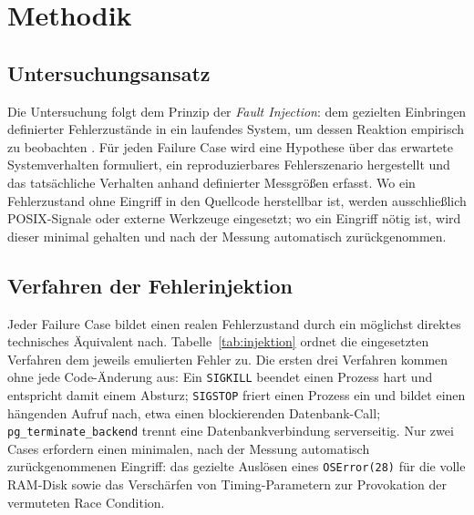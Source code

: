 
\section{Methodik}
\label{sec:methodik}

\subsection{Untersuchungsansatz}
\label{sec:methodik-ansatz}

Die Untersuchung folgt dem Prinzip der \textit{Fault Injection}: dem gezielten Einbringen
definierter Fehlerzustände in ein laufendes System, um dessen Reaktion empirisch zu
beobachten \cite{hsueh1997}. Für jeden Failure Case wird eine Hypothese über das erwartete
Systemverhalten formuliert, ein reproduzierbares Fehlerszenario hergestellt und das
tatsächliche Verhalten anhand definierter Messgrößen erfasst. Wo ein Fehlerzustand ohne
Eingriff in den Quellcode herstellbar ist, werden ausschließlich POSIX-Signale oder
externe Werkzeuge eingesetzt; wo ein Eingriff nötig ist, wird dieser minimal gehalten und
nach der Messung automatisch zurückgenommen.

\subsection{Verfahren der Fehlerinjektion}
\label{sec:methodik-injektion}

Jeder Failure Case bildet einen realen Fehlerzustand durch ein möglichst direktes
technisches Äquivalent nach. Tabelle~\ref{tab:injektion} ordnet die eingesetzten Verfahren
dem jeweils emulierten Fehler zu. Die ersten drei Verfahren kommen ohne jede
Code-Änderung aus: Ein \texttt{SIGKILL} beendet einen Prozess hart und entspricht damit
einem Absturz; \texttt{SIGSTOP} friert einen Prozess ein und bildet einen hängenden
Aufruf nach, etwa einen blockierenden Datenbank-Call; \texttt{pg\_terminate\_backend}
trennt eine Datenbankverbindung serverseitig. Nur zwei Cases erfordern einen minimalen,
nach der Messung automatisch zurückgenommenen Eingriff: das gezielte Auslösen eines
\texttt{OSError(28)} für die volle RAM-Disk sowie das Verschärfen von Timing-Parametern
zur Provokation der vermuteten Race Condition.

